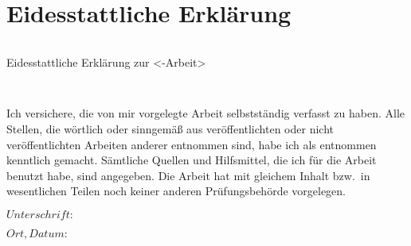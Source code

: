 \section*{Eidesstattliche Erklärung}
\thispagestyle{empty}

\begin{verbatim}

\end{verbatim}

\begin{LARGE}Eidesstattliche Erklärung zur <-Arbeit>\end{LARGE}
\begin{verbatim}


\end{verbatim}
Ich versichere, die von mir vorgelegte Arbeit selbstständig verfasst zu haben. Alle Stellen, die wörtlich oder sinngemäß aus veröffentlichten oder nicht veröffentlichten Arbeiten anderer entnommen sind, habe ich als entnommen kenntlich gemacht. Sämtliche Quellen und Hilfsmittel, die ich für die Arbeit benutzt habe, sind angegeben. Die Arbeit hat mit gleichem Inhalt bzw.\ in wesentlichen Teilen noch keiner anderen Prüfungsbehörde vorgelegen.

\vspace{1.5em}
\noindent{}
\begin{multicols}{2}
    \noindent{}
    \begin{minipage}{\dimexpr(\textwidth - 5.0pt)} %
        \( Unterschrift: \)
    \end{minipage}
    \noindent{}
    \begin{minipage}{\dimexpr(0.5\textwidth - 5.0pt)} %
        \( Ort, Datum: \)
    \end{minipage}
\end{multicols}

